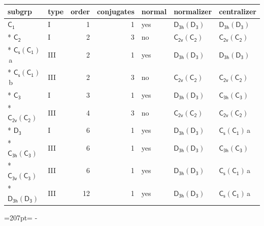 \documentclass[10pt,a4paper]{article}
\newcommand{\needspace}[1]{\par\penalty-100\begingroup\dimen0=#1\relax\dimen2=\pagegoal
  \advance\dimen2-\pagetotal\ifdim\dimen0>\dimen2\relax\ifdim\dimen2>0pt\vfil\break\fi\fi
  \endgroup}
\numberwithin{equation}{section}
\newcommand{\grp}[1]{\mathsf{#1}}
\newcommand{\clsletter}[1]{\,{\scriptsize\color{black!55}#1}}
\begin{document}
{\small\begin{longtable}{@{}llrrlll@{}}\toprule
subgrp & type & order & conjugates & normal & normalizer & centralizer\\\midrule\endhead
\bottomrule\endfoot\endlastfoot
\href{../../../rotation/data/pdf/C1.pdf}{$\grp{C_{1}}$} & I & 1 & 1 & yes & \href{D3h-D3.pdf}{$\grp{D_{3h}}(\grp{D_{3}})$} & \href{D3h-D3.pdf}{$\grp{D_{3h}}(\grp{D_{3}})$}\\*
\href{../../../rotation/data/pdf/C2.pdf}{$\grp{C_{2}}$} & I & 2 & 3 & no & \href{C2v-C2.pdf}{$\grp{C_{2v}}(\grp{C_{2}})$} & \href{C2v-C2.pdf}{$\grp{C_{2v}}(\grp{C_{2}})$}\\*
\href{C1v-C1.pdf}{$\grp{C_{s}}(\grp{C_{1}})$}\clsletter{a} & III & 2 & 1 & yes & \href{D3h-D3.pdf}{$\grp{D_{3h}}(\grp{D_{3}})$} & \href{D3h-D3.pdf}{$\grp{D_{3h}}(\grp{D_{3}})$}\\*
\href{C1v-C1.pdf}{$\grp{C_{s}}(\grp{C_{1}})$}\clsletter{b} & III & 2 & 3 & no & \href{C2v-C2.pdf}{$\grp{C_{2v}}(\grp{C_{2}})$} & \href{C2v-C2.pdf}{$\grp{C_{2v}}(\grp{C_{2}})$}\\*
\href{../../../rotation/data/pdf/C3.pdf}{$\grp{C_{3}}$} & I & 3 & 1 & yes & \href{D3h-D3.pdf}{$\grp{D_{3h}}(\grp{D_{3}})$} & \href{C3h-C3.pdf}{$\grp{C_{3h}}(\grp{C_{3}})$}\\*
\href{C2v-C2.pdf}{$\grp{C_{2v}}(\grp{C_{2}})$} & III & 4 & 3 & no & \href{C2v-C2.pdf}{$\grp{C_{2v}}(\grp{C_{2}})$} & \href{C2v-C2.pdf}{$\grp{C_{2v}}(\grp{C_{2}})$}\\*
\href{../../../rotation/data/pdf/D3.pdf}{$\grp{D_{3}}$} & I & 6 & 1 & yes & \href{D3h-D3.pdf}{$\grp{D_{3h}}(\grp{D_{3}})$} & \href{C1v-C1.pdf}{$\grp{C_{s}}(\grp{C_{1}})$}\clsletter{a}\\*
\href{C3h-C3.pdf}{$\grp{C_{3h}}(\grp{C_{3}})$} & III & 6 & 1 & yes & \href{D3h-D3.pdf}{$\grp{D_{3h}}(\grp{D_{3}})$} & \href{C3h-C3.pdf}{$\grp{C_{3h}}(\grp{C_{3}})$}\\*
\href{C3v-C3.pdf}{$\grp{C_{3v}}(\grp{C_{3}})$} & III & 6 & 1 & yes & \href{D3h-D3.pdf}{$\grp{D_{3h}}(\grp{D_{3}})$} & \href{C1v-C1.pdf}{$\grp{C_{s}}(\grp{C_{1}})$}\clsletter{a}\\*
\href{D3h-D3.pdf}{$\grp{D_{3h}}(\grp{D_{3}})$} & III & 12 & 1 & yes & \href{D3h-D3.pdf}{$\grp{D_{3h}}(\grp{D_{3}})$} & \href{C1v-C1.pdf}{$\grp{C_{s}}(\grp{C_{1}})$}\clsletter{a}\\
\bottomrule\end{longtable}}
\needspace{207pt}
\end{document}
